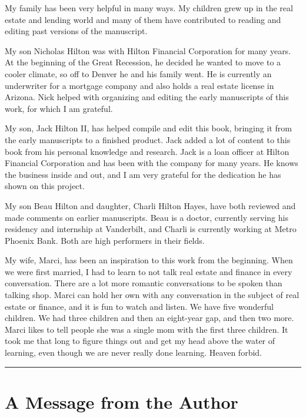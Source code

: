 \documentclass[
]{book}
\begin{document}
My family has been very helpful in many ways. My children grew up in the real estate and lending world and many of them have contributed to reading and editing past versions of the manuscript.

My son Nicholas Hilton was with Hilton Financial Corporation for many years. At the beginning of the Great Recession, he decided he wanted to move to a cooler climate, so off to Denver he and his family went. He is currently an underwriter for a mortgage company and also holds a real estate license in Arizona. Nick helped with organizing and editing the early manuscripts of this work, for which I am grateful.

My son, Jack Hilton II, has helped compile and edit this book, bringing it from the early manuscripts to a finished product. Jack added a lot of content to this book from his personal knowledge and research. Jack is a loan officer at Hilton Financial Corporation and has been with the company for many years. He knows the business inside and out, and I am very grateful for the dedication he has shown on this project.

My son Beau Hilton and daughter, Charli Hilton Hayes, have both reviewed and made comments on earlier manuscripts. Beau is a doctor, currently serving his residency and internship at Vanderbilt, and Charli is currently working at Metro Phoenix Bank. Both are high performers in their fields.

My wife, Marci, has been an inspiration to this work from the beginning. When we were first married, I had to learn to not talk real estate and finance in every conversation. There are a lot more romantic conversations to be spoken than talking shop. Marci can hold her own with any conversation in the subject of real estate or finance, and it is fun to watch and listen. We have five wonderful children. We had three children and then an eight-year gap, and then two more. Marci likes to tell people she was a single mom with the first three children. It took me that long to figure things out and get my head above the water of learning, even though we are never really done learning. Heaven forbid.

\begin{center}\rule{0.5\linewidth}{0.5pt}\end{center}

\hypertarget{authormessage}{%
\chapter*{A Message from the Author}\label{authormessage}}
\end{document}
